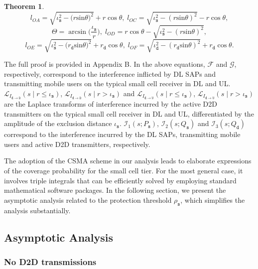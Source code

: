 \documentclass[twocolumn,english]{IEEEtran}
\theoremstyle{plain}
\theoremstyle{definition}
\newtheorem{theorem}{\textbf{Theorem}}
\begin{document}
\begin{theorem}
{\[\]
\[
l_{OA}=\sqrt{\iota_{\mathtt{s}}^{2}-\bigl(r\textrm{sin}\theta\bigr)^{2}}+r\cos\theta,\; l_{OC}=\sqrt{\iota_{\mathtt{s}}^{2}-\left(r\textrm{sin}\theta\right)^{2}}-r\cos\theta,
\]
\[
\Theta=\arcsin\bigl(\frac{\iota_{\mathtt{s}}}{r}\bigr),\; l_{OD}=r\cos\theta-\sqrt{\iota_{\mathtt{s}}^{2}-\left(r\textrm{sin}\theta\right)^{2}},
\]
\[
l_{OE}=\sqrt{\iota_{\mathtt{s}}^{2}-\bigl(r_{\mathtt{d}}\textrm{sin}\theta\bigr)^{2}}+r_{\mathtt{d}}\cos\theta,\; l_{OF}=\sqrt{\iota_{\mathtt{d}}^{2}-\left(r_{\mathtt{d}}\textrm{sin}\theta\right)^{2}}+r_{\mathtt{d}}\cos\theta.
\]
}{\small \par}
\begin{IEEEproof}
The full proof is provided in Appendix B. In the above equations,
$\mathcal{F}$ and $\mathcal{G}$, respectively, correspond to the
interference inflicted by DL SAPs and transmitting mobile users on
the typical small cell receiver in DL and UL. $\mathcal{L}_{I_{\mathtt{d\rightarrow D}}}(s\mid r\leq\iota_{\mathtt{s}})$,
$\mathcal{L}_{I_{\mathtt{d\rightarrow D}}}(s\mid r>\iota_{\mathtt{s}})$
and $\mathcal{L}_{I_{\mathtt{d\rightarrow U}}}(s\mid r\leq\iota_{\mathtt{s}})$,
$\mathcal{L}_{I_{\mathtt{d\rightarrow U}}}(s\mid r>\iota_{\mathtt{s}})$
are the Laplace transforms of interference incurred by the active
D2D transmitters on the typical small cell receiver in DL and UL,
differentiated by the amplitude of the exclusion distance $\iota_{\mathtt{s}}$.
$\mathcal{I}_{1}(s;P_{\mathtt{s}})$, $\mathcal{I}_{2}(s;Q_{\mathtt{s}})$
and $\mathcal{I}_{3}(s;Q_{\mathtt{d}})$ correspond to the interference
incurred by the DL SAPs, transmitting mobile users and active D2D
transmitters, respectively.
\end{IEEEproof}
\end{theorem}

The adoption of the CSMA scheme in our analysis leads to elaborate
expressions of the coverage probability for the small cell tier. For
the most general case, it involves triple integrals that can be efficiently
solved by employing standard mathematical software packages. In the
following section, we present the asymptotic analysis related to the
protection threshold $\rho_{\mathtt{s}}$, which simplifies the analysis
substantially.


\subsection{Asymptotic Analysis}


\subsubsection{No D2D transmissions}
\end{document}
